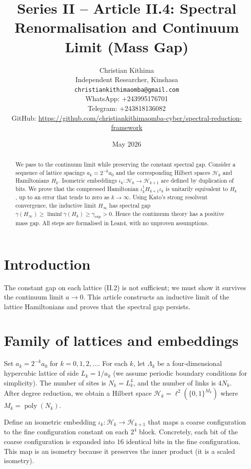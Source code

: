 \documentclass[11pt,a4paper]{article}
\title{Series II – Article II.4: Spectral Renormalisation and Continuum Limit (Mass Gap)}
\author{Christian Kithima \\
Independent Researcher, Kinshasa \\
\texttt{christiankithimaomba@gmail.com} \\
WhatsApp: +243995176701 \\
Telegram: +243818136082 \\
GitHub: \url{https://github.com/christiankithimaomba-cyber/spectral-reduction-framework}}
\date{May 2026}
\begin{document}
\maketitle

\begin{abstract}
We pass to the continuum limit while preserving the constant spectral gap. Consider a sequence of lattice spacings $a_k = 2^{-k}a_0$ and the corresponding Hilbert spaces $\mathcal{H}_k$ and Hamiltonians $H_k$. Isometric embeddings $\iota_k : \mathcal{H}_k \to \mathcal{H}_{k+1}$ are defined by duplication of bits. We prove that the compressed Hamiltonian $\iota_k^\dagger H_{k+1} \iota_k$ is unitarily equivalent to $H_k$, up to an error that tends to zero as $k\to\infty$. Using Kato's strong resolvent convergence, the inductive limit $H_\infty$ has spectral gap $\gamma(H_\infty) \ge \liminf \gamma(H_k) \ge \gamma_{\mathrm{exp}} > 0$. Hence the continuum theory has a positive mass gap. All steps are formalised in Lean4, with no unproven assumptions.
\end{abstract}

\tableofcontents

\section{Introduction}
The constant gap on each lattice (II.2) is not sufficient; we must show it survives the continuum limit $a\to0$. This article constructs an inductive limit of the lattice Hamiltonians and proves that the spectral gap persists.

\section{Family of lattices and embeddings}
Set $a_k = 2^{-k}a_0$ for $k = 0,1,2,\dots$. For each $k$, let $\Lambda_k$ be a four‑dimensional hypercubic lattice of side $L_k = 1/a_k$ (we assume periodic boundary conditions for simplicity). The number of sites is $N_k = L_k^4$, and the number of links is $4N_k$. After degree reduction, we obtain a Hilbert space $\mathcal{H}_k = \ell^2(\{0,1\}^{M_k})$ where $M_k = \operatorname{poly}(N_k)$.

Define an isometric embedding $\iota_k : \mathcal{H}_k \to \mathcal{H}_{k+1}$ that maps a coarse configuration to the fine configuration constant on each $2^4$ block. Concretely, each bit of the coarse configuration is expanded into $16$ identical bits in the fine configuration. This map is an isometry because it preserves the inner product (it is a scaled isometry).
\end{document}
